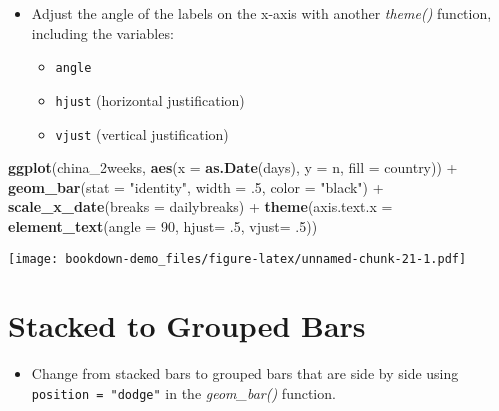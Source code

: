 \documentclass[]{book}
\newenvironment{Shaded}{\begin{snugshade}}{\end{snugshade}}
\newcommand{\KeywordTok}[1]{\textcolor[rgb]{0.13,0.29,0.53}{\textbf{{#1}}}}
\newcommand{\DataTypeTok}[1]{\textcolor[rgb]{0.13,0.29,0.53}{{#1}}}
\newcommand{\DecValTok}[1]{\textcolor[rgb]{0.00,0.00,0.81}{{#1}}}
\newcommand{\StringTok}[1]{\textcolor[rgb]{0.31,0.60,0.02}{{#1}}}
\newcommand{\NormalTok}[1]{{#1}}
\providecommand{\tightlist}{%
  \setlength{\itemsep}{0pt}\setlength{\parskip}{0pt}}
\theoremstyle{definition}
\theoremstyle{definition}
\theoremstyle{remark}
\begin{document}
\begin{itemize}
\tightlist
\item
  Adjust the angle of the labels on the x-axis with another
  \emph{theme()} function, including the variables:

  \begin{itemize}
  \tightlist
  \item
    \texttt{angle}
  \item
    \texttt{hjust} (horizontal justification)
  \item
    \texttt{vjust} (vertical justification)
  \end{itemize}
\end{itemize}

\begin{Shaded}
\begin{Highlighting}[]
\KeywordTok{ggplot}\NormalTok{(china_2weeks, }\KeywordTok{aes}\NormalTok{(}\DataTypeTok{x =} \KeywordTok{as.Date}\NormalTok{(days), }\DataTypeTok{y =} \NormalTok{n, }\DataTypeTok{fill =} \NormalTok{country)) +}
\StringTok{  }\KeywordTok{geom_bar}\NormalTok{(}\DataTypeTok{stat =} \StringTok{"identity"}\NormalTok{, }\DataTypeTok{width =} \NormalTok{.}\DecValTok{5}\NormalTok{, }\DataTypeTok{color =} \StringTok{"black"}\NormalTok{) +}
\StringTok{  }\KeywordTok{scale_x_date}\NormalTok{(}\DataTypeTok{breaks =} \NormalTok{dailybreaks) +}
\StringTok{  }\KeywordTok{theme}\NormalTok{(}\DataTypeTok{axis.text.x =} \KeywordTok{element_text}\NormalTok{(}\DataTypeTok{angle =} \DecValTok{90}\NormalTok{, }\DataTypeTok{hjust=} \NormalTok{.}\DecValTok{5}\NormalTok{, }\DataTypeTok{vjust=} \NormalTok{.}\DecValTok{5}\NormalTok{))}
\end{Highlighting}
\end{Shaded}

\texttt{[image: bookdown-demo\_files/figure-latex/unnamed-chunk-21-1.pdf]}

\section{Stacked to Grouped Bars}\label{stacked-to-grouped-bars}

\begin{itemize}
\tightlist
\item
  Change from stacked bars to grouped bars that are side by side using
  \texttt{position\ =\ "dodge"} in the \emph{geom\_bar()} function.
\end{itemize}
\end{document}
